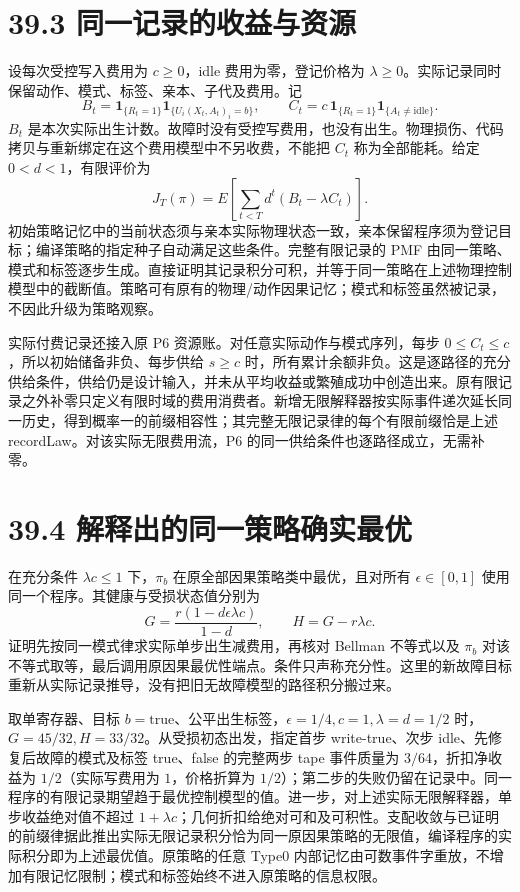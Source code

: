 \documentclass[
  11pt,
  oneside]{book}
\begin{document}
\section{39.3 同一记录的收益与资源}\label{ux540cux4e00ux8bb0ux5f55ux7684ux6536ux76caux4e0eux8d44ux6e90}

设每次受控写入费用为 \(c\ge0\)，idle 费用为零，登记价格为 \(\lambda\ge0\)。实际记录同时保留动作、模式、标签、亲本、子代及费用。记 \[B_t=\mathbf1_{\{R_t=1\}}\mathbf1_{\{U_i(X_t,A_t)_i=b\}},\qquad
C_t=c\,\mathbf1_{\{R_t=1\}}\mathbf1_{\{A_t\ne\mathrm{idle}\}}.\] \(B_t\) 是本次实际出生计数。故障时没有受控写费用，也没有出生。物理损伤、代码拷贝与重新绑定在这个费用模型中不另收费，不能把 \(C_t\) 称为全部能耗。给定 \(0<d<1\)，有限评价为 \[J_T(\pi)=E\!\left[\sum_{t<T}d^t(B_t-\lambda C_t)\right].\] 初始策略记忆中的当前状态须与亲本实际物理状态一致，亲本保留程序须为登记目标；编译策略的指定种子自动满足这些条件。完整有限记录的 PMF 由同一策略、模式和标签逐步生成。直接证明其记录积分可积，并等于同一策略在上述物理控制模型中的截断值。策略可有原有的物理/动作因果记忆；模式和标签虽然被记录，不因此升级为策略观察。

实际付费记录还接入原 P6 资源账。对任意实际动作与模式序列，每步 \(0\le C_t\le c\)，所以初始储备非负、每步供给 \(s\ge c\) 时，所有累计余额非负。这是逐路径的充分供给条件，供给仍是设计输入，并未从平均收益或繁殖成功中创造出来。原有限记录之外补零只定义有限时域的费用消费者。新增无限解释器按实际事件递次延长同一历史，得到概率一的前缀相容性；其完整无限记录律的每个有限前缀恰是上述 recordLaw。对该实际无限费用流，P6 的同一供给条件也逐路径成立，无需补零。

\section{39.4 解释出的同一策略确实最优}\label{ux89e3ux91caux51faux7684ux540cux4e00ux7b56ux7565ux786eux5b9eux6700ux4f18}

在充分条件 \(\lambda c\le1\) 下，\(\pi_b\) 在原全部因果策略类中最优，且对所有 \(\epsilon\in[0,1]\) 使用同一个程序。其健康与受损状态值分别为 \[G=\frac{r(1-d\epsilon\lambda c)}{1-d},\qquad H=G-r\lambda c.\] 证明先按同一模式律求实际单步出生减费用，再核对 Bellman 不等式以及 \(\pi_b\) 对该不等式取等，最后调用原因果最优性端点。条件只声称充分性。这里的新故障目标重新从实际记录推导，没有把旧无故障模型的路径积分搬过来。

取单寄存器、目标 \(b=\mathrm{true}\)、公平出生标签，\(\epsilon=1/4,c=1,\lambda=d=1/2\) 时，\(G=45/32,H=33/32\)。从受损初态出发，指定首步 write-true、次步 idle、先修复后故障的模式及标签 true、false 的完整两步 tape 事件质量为 \(3/64\)，折扣净收益为 \(1/2\)（实际写费用为 \(1\)，价格折算为 \(1/2\)）；第二步的失败仍留在记录中。同一程序的有限记录期望趋于最优控制模型的值。进一步，对上述实际无限解释器，单步收益绝对值不超过 \(1+\lambda c\)；几何折扣给绝对可和及可积性。支配收敛与已证明的前缀律据此推出实际无限记录积分恰为同一原因果策略的无限值，编译程序的实际积分即为上述最优值。原策略的任意 Type0 内部记忆由可数事件字重放，不增加有限记忆限制；模式和标签始终不进入原策略的信息权限。
\end{document}
